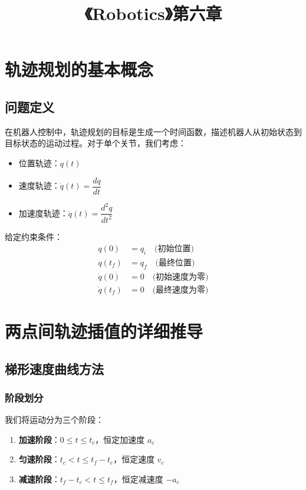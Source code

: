 \documentclass[12pt,a4paper]{article}
\title{\textbf{《Robotics》第六章}}
\author{}
\date{}
\begin{document}
\maketitle

\section{轨迹规划的基本概念}

\subsection{问题定义}

在机器人控制中，轨迹规划的目标是生成一个时间函数，描述机器人从初始状态到目标状态的运动过程。对于单个关节，我们考虑：

\begin{itemize}
    \item 位置轨迹：$q(t)$
    \item 速度轨迹：$\dot{q}(t) = \dfrac{dq}{dt}$
    \item 加速度轨迹：$\ddot{q}(t) = \dfrac{d^2q}{dt^2}$
\end{itemize}

给定约束条件：
\begin{align*}
    q(0) &= q_i \quad \text{(初始位置)} \\
    q(t_f) &= q_f \quad \text{(最终位置)} \\
    \dot{q}(0) &= 0 \quad \text{(初始速度为零)} \\
    \dot{q}(t_f) &= 0 \quad \text{(最终速度为零)}
\end{align*}

\section{两点间轨迹插值的详细推导}

\subsection{梯形速度曲线方法}

\subsubsection{阶段划分}

我们将运动分为三个阶段：

\begin{enumerate}
    \item \textbf{加速阶段}：$0 \leq t \leq t_c$，恒定加速度 $a_c$
    \item \textbf{匀速阶段}：$t_c < t \leq t_f - t_c$，恒定速度 $v_c$
    \item \textbf{减速阶段}：$t_f - t_c < t \leq t_f$，恒定减速度 $-a_c$
\end{enumerate}
\end{document}
